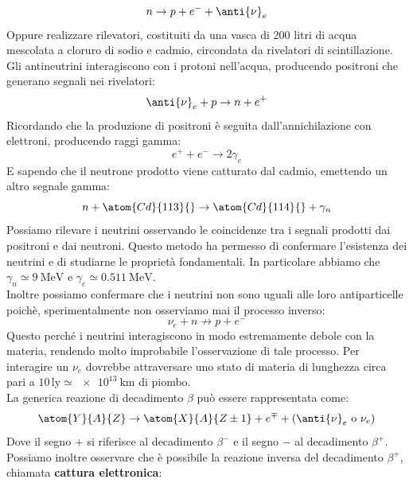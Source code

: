 \begin{equation}
    n \to p + e^- + \anti{\nu}_{e}
\end{equation}
Oppure realizzare rilevatori, costituiti da una vasca di 200 litri di acqua mescolata a cloruro di sodio e cadmio, circondata da rivelatori di scintillazione. Gli antineutrini interagiscono con i protoni nell'acqua, producendo positroni che generano segnali nei rivelatori:
\begin{equation}
    \anti{\nu}_{e} + p \to n + e^+
\end{equation}
Ricordando che la produzione di positroni è seguita dall'annichilazione con elettroni, producendo raggi gamma:
\begin{equation}
    e^+ + e^- \to 2\gamma_{e}
\end{equation}
E sapendo che il neutrone prodotto viene catturato dal cadmio, emettendo un altro segnale gamma:
\begin{equation}
    n + \atom{Cd}{113}{} \to \atom{Cd}{114}{} + \gamma_n
\end{equation}
Possiamo rilevare i neutrini osservando le coincidenze tra i segnali prodotti dai positroni e dai neutroni. Questo metodo ha permesso di confermare l'esistenza dei neutrini e di studiarne le proprietà fondamentali. In particolare abbiamo che $\gamma_n \simeq \qty{9}{\mega\electronvolt}$ e $\gamma_{e} \simeq \qty{0.511}{\mega\electronvolt}$.\\
Inoltre possiamo confermare che i neutrini non sono uguali alle loro antiparticelle poichè, sperimentalmente non osserviamo mai il processo inverso:
\begin{equation}
    {\nu}_{e} + n \not\to p + e^-
\end{equation}
Questo perché i neutrini interagiscono in modo estremamente debole con la materia, rendendo molto improbabile l'osservazione di tale processo. Per interagire un $\nu_{e}$ dovrebbe attraversare uno stato di materia di lunghezza circa pari a $10\,\text{ly} \simeq \qty{e13}{\kilo\meter}$ di piombo.\\
La generica reazione di decadimento $\beta$ può essere rappresentata come:
\begin{equation}
    \atom{Y}{A}{Z} \to \atom{X}{A}{Z \pm 1} + e^{\mp} + (\anti{\nu}_{e} \text{ o } {\nu}_{e})
\end{equation}
Dove il segno $+$ si riferisce al decadimento $\beta^-$ e il segno $-$ al decadimento $\beta^+$.\\
Possiamo inoltre osservare che è possibile la reazione inversa del decadimento $\beta^+$, chiamata \textbf{cattura elettronica}:
